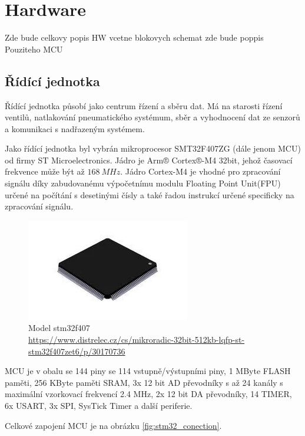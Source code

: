 \chapter{Hardware}
Zde bude celkovy popis HW vcetne blokovych schemat
zde bude poppis Pouziteho MCU


\section{Řídící jednotka}

Řídící jednotka působí jako centrum řízení a sběru dat. Má na starosti řízení ventilů, natlakování pneumatického systémum, sběr a vyhodnocení
dat ze senzorů a komunikaci s nadřazeným systémem. \par


Jako řídící jednotka byl vybrán mikroprocesor SMT32F407ZG (dále jenom MCU) od firmy ST Microelectronics.
Jádro je Arm® Cortex®-M4 32bit, jehož časovací frekvence může být až $168 \ MHz$. Jádro Cortex-M4 je vhodné pro zpracování signálu díky zabudovanému výpočetnímu modulu Floating Point Unit(FPU) určené na
počítání s desetinými čísly a také řadou instrukcí určené specificky na zpracování signálu.


\begin{figure}[H]
    \centering
    \includegraphics[width=0.5\linewidth]{pictures/stm32f407.jpg}
    \caption{Model stm32f407 \\ \url{https://www.distrelec.cz/cs/mikroradic-32bit-512kb-lqfp-st-stm32f407zet6/p/30170736}}
    \label{fig:stm32}
\end{figure}
MCU je v obalu se 144 piny se 114 vstupně/výstupními piny, 1 MByte FLASH paměti, 256 KByte paměti SRAM, 3x 12 bit AD převodníky s až 24 kanály s maximální vzorkovací frekvencí 2.4 MHz,
2x 12 bit DA převodníky, 14 TIMER, 6x USART, 3x SPI, SysTick Timer a další periferie.
\par
Celkové zapojení MCU je na obrázku \ref{fig:stm32_conection}.

